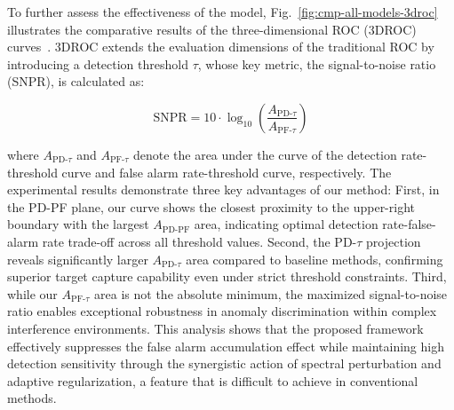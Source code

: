 To further assess the effectiveness of the model, Fig.~\ref{fig:cmp-all-models-3droc} illustrates the comparative results of the three-dimensional ROC (3DROC) curves~\cite{chang2020effective,song20203}. 3DROC extends the evaluation dimensions of the traditional ROC by introducing a detection threshold $\tau$, whose key metric, the signal-to-noise ratio (SNPR), is calculated as:

\begin{equation}
\text{SNPR} = 10 \cdot \log_{10}\left(\frac{A_{\text{PD-}\tau}}{A_{\text{PF-}\tau}}\right)
\end{equation}

where $A_{\text{PD-}\tau}$ and $A_{\text{PF-}\tau}$ denote the area under the curve of the detection rate-threshold curve and false alarm rate-threshold curve, respectively. The experimental results demonstrate three key advantages of our method: First, in the PD-PF plane, our curve shows the closest proximity to the upper-right boundary with the largest $A_{\text{PD-PF}}$ area, indicating optimal detection rate-false-alarm rate trade-off across all threshold values. Second, the PD-$\tau$ projection reveals significantly larger $A_{\text{PD-}\tau}$ area compared to baseline methods, confirming superior target capture capability even under strict threshold constraints. Third, while our $A_{\text{PF-}\tau}$ area is not the absolute minimum, the maximized signal-to-noise ratio enables exceptional robustness in anomaly discrimination within complex interference environments. This analysis shows that the proposed framework effectively suppresses the false alarm accumulation effect while maintaining high detection sensitivity through the synergistic action of spectral perturbation and adaptive regularization, a feature that is difficult to achieve in conventional methods.



